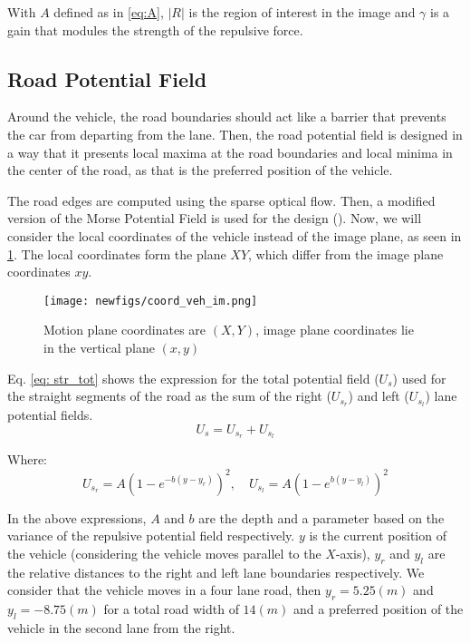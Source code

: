 \documentclass[letterpaper, 10 pt, conference]{ieeeconf}  %
\begin{document}
With $A$ defined as in \eqref{eq:A}, $|R|$ is the region of interest in the image and $\gamma$ is a gain that modules the strength of the repulsive force.

\subsection{Road Potential Field} \label{sec:rpf}

Around the vehicle, the road boundaries should act like a barrier that prevents the car from departing from the lane. Then, the road potential field is designed in a way that it presents local maxima at the road boundaries and local minima in the center of the road, as that is the preferred position of the vehicle.

The road edges are computed using the sparse optical flow. Then, a modified version of the Morse Potential Field is used for the design (\cite{snapper2018model,raksincharoensak2016vehicle}). Now, we will consider the local coordinates of the vehicle instead of the image plane, as seen in \ref{fig:coordveh}. The local coordinates form the plane $XY$, which differ from the image plane coordinates $xy$.

    \begin{figure}
    \centering
    \texttt{[image: newfigs/coord\_veh\_im.png]}
    \caption{Motion plane coordinates are $(X,Y)$, image plane coordinates lie in the vertical plane $(x,y)$}
    \label{fig:coordveh}
    \end{figure}

 Eq. \eqref{eq: str_tot} shows the expression for the total potential field ($U_s$) used for the straight segments of the road as the sum of the right ($U_{s_r}$) and left ($U_{s_l}$) lane potential fields.
\begin{equation}\label{eq: str_tot}
    U_s = U_{s_r} + U_{s_l}
\end{equation}

Where:
\begin{equation}\label{eq:str0_right}
        U_{s_r} = A \left( 1-e^{-b(y-y_r)} \right)^2,\quad U_{s_l} = A \left( 1-e^{b(y-y_l)} \right)^2
\end{equation}
        

In the above expressions, $A$ and $b$ are the depth and a parameter based on the variance of the repulsive potential field respectively. $y$ is the current position of the vehicle (considering the vehicle moves parallel to the $X$-axis), $y_r$ and $y_l$ are the relative distances to the right and left lane boundaries respectively. We consider that the vehicle moves in a four lane road, then $y_r = 5.25 (m)$ and $y_l = -8.75 (m)$ for a total road width of $14 (m)$ and a preferred position of the vehicle in the second lane from the right.
\end{document}
